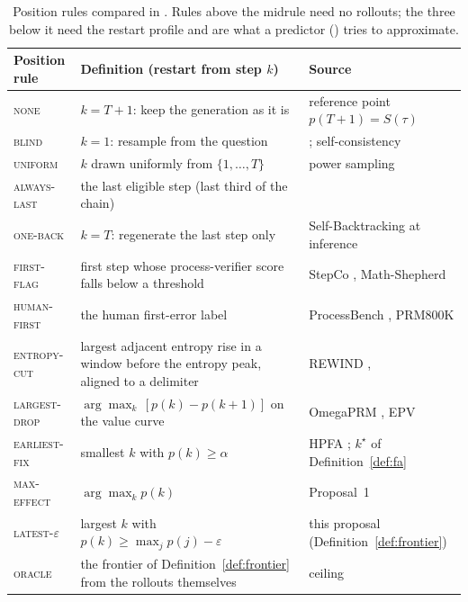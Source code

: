 \begin{table}[h]\centering\small
\begin{tabularx}{\linewidth}{@{}>{\RaggedRight\hsize=0.75\hsize}X >{\RaggedRight\hsize=1.35\hsize}X >{\RaggedRight\hsize=0.9\hsize}X@{}}\toprule
Position rule & Definition (restart from step $k$) & Source \\\midrule
\textsc{none} & $k=T{+}1$: keep the generation as it is & reference point $p(T{+}1)=S(\tau)$ \\
\textsc{blind} & $k=1$: resample from the question & \citet{verma2026tryagain}; self-consistency \\
\textsc{uniform} & $k$ drawn uniformly from $\{1,\dots,T\}$ & power sampling \cite{karan2026power} \\
\textsc{always-last} & the last eligible step (last third of the chain) & \citet{atri2026expanding} \\
\textsc{one-back} & $k=T$: regenerate the last step only & Self-Backtracking at inference \cite{yang2025selfbacktrack} \\
\textsc{first-flag} & first step whose process-verifier score falls below a threshold & StepCo \cite{wu2024stepco}, Math-Shepherd \cite{wang2024mathshepherd} \\
\textsc{human-first} & the human first-error label & ProcessBench \cite{zheng2024processbench}, PRM800K \cite{lightman2023prm} \\
\textsc{entropy-cut} & largest adjacent entropy rise in a window before the entropy peak, aligned to a delimiter & REWIND \cite{ding2026rewind}, \citet{zhou2026entropycut} \\
\textsc{largest-drop} & $\arg\max_k\,[p(k)-p(k{+}1)]$ on the value curve & OmegaPRM \cite{luo2024omegaprm}, EPV \cite{shen2026epv} \\
\textsc{earliest-fix} & smallest $k$ with $p(k)\ge\alpha$ & HPFA \cite{zhu2026hpfa}; $k^\star$ of Definition~\ref{def:fa} \\
\textsc{max-effect} & $\arg\max_k p(k)$ & Proposal~1 \\
\textsc{latest-}$\varepsilon$ & largest $k$ with $p(k)\ge\max_j p(j)-\varepsilon$ & this proposal (Definition~\ref{def:frontier}) \\
\textsc{oracle} & the frontier of Definition~\ref{def:frontier} from the rollouts themselves & ceiling \\\bottomrule
\end{tabularx}
\caption{Position rules compared in . Rules above the midrule need no rollouts; the three below it need the restart profile and are what a predictor () tries to approximate.}
\label{tab:rules}
\end{table}

